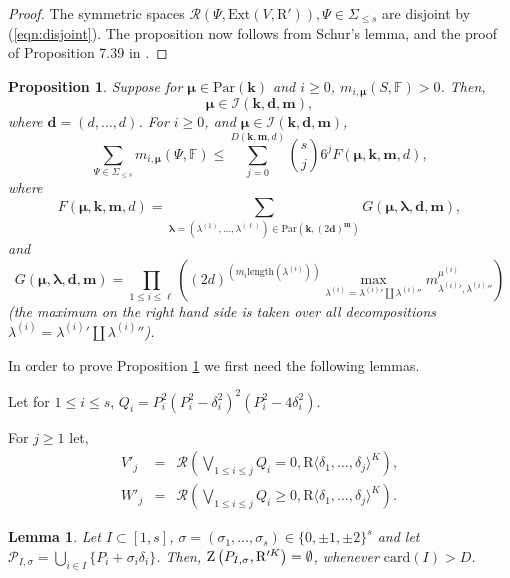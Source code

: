\documentclass{amsart}
\newtheorem{lemma}{Lemma}
\newtheorem{proposition}{Proposition}
\theoremstyle{definition}
\theoremstyle{remark}
\numberwithin{equation}{section}
\begin{document}
\begin{proof}
 The symmetric spaces ${{\mathcal R}} \left(\Psi , {\mathrm{Ext}} \left(V, {\mathrm{R}}' \right) \right) ,
\Psi \in \Sigma_{\leq s}$ are disjoint by (\ref{eqn:disjoint}). The 
proposition now follows from Schur's lemma,
and the proof of Proposition 7.39 in {\cite{BPRbook2}}.
\end{proof}

\begin{proposition}
  \label{7:prop:betti closed}
  Suppose for $\pmb{\mu} \in {\mathrm{Par}}({\mathbf{k}})$ and $i \geq 0$,
  $m_{i, \pmb{\mu}}(S,{\mathbb{F}}) >0$. 
 Then, 
 \begin{equation}
\label{eqn:restriction-on-specht-sa}
\pmb{\mu}  \in 
\mathcal{I}({\mathbf{k}},{\mathbf{d}},{\mathbf{m}}),
\end{equation}
where ${\mathbf{d}} = (d,\ldots,d)$.
For $i \geq 0$, and $\pmb{\mu}  \in 
\mathcal{I}({\mathbf{k}},{\mathbf{d}},{\mathbf{m}})$,
  \[ 
  \sum_{\Psi \in \Sigma_{\le s}} m_{i,\pmb{\mu}}(\Psi,{\mathbb{F}}) \leq 
  \sum_{j=0}^{D({\mathbf{k}},{\mathbf{m}},d)} \binom{s}{j} 6^{j} 
  F(\pmb{\mu}, {\mathbf{k}},{\mathbf{m}},d),
  \]
  where 
  \[
  F(\pmb{\mu},{\mathbf{k}},{\mathbf{m}},d) = 
  \sum_{\pmb{\lambda}=(\lambda^{(1)},\ldots,\lambda^{(\ell)})\in {\mathrm{Par}}({\mathbf{k}}, (2{\mathbf{d}})^{\mathbf{m}})}
G(\pmb{\mu},\pmb{\lambda},{\mathbf{d}},{\mathbf{m}}),
 \]
 and 
\[
G(\pmb{\mu},\pmb{\lambda},{\mathbf{d}},{\mathbf{m}}) =
\prod_{1 \leq i \leq \ell}
 \left(
 (2 d)^{(m_i{\mathrm{length}}(\lambda^{(i)}))}
 \max_{\lambda^{(i)} = {\lambda^{(i)}}' \coprod {\lambda^{(i)}}''}
 m^{\mu^{(i)}}_{{\lambda^{(i)}}',{\lambda^{(i)}}''}
 \right)
 \]
(the maximum on the right hand side is taken over all decompositions
$\lambda^{(i)} = {\lambda^{(i)}}' \coprod {\lambda^{(i)}}''$). 
 \end{proposition}

In order to prove Proposition \ref{7:prop:betti closed} we first need the following lemmas.

Let for $1 \leq i \leq s$, 
$Q_{i} =P_{i}^{2} (P_{i}^{2} - \delta_{i}^{2})^{2} (P_{i}^{2} -4
\delta_{i}^{2})$.

For $j \ge 1$ let,
\begin{eqnarray*}
  V'_{j} & = & {{\mathcal R}}(\bigvee_{1 \leq i \leq j} Q_{i} =0, {\mathrm{R}} {{\langle}}\delta_{1} , \ldots , \delta_{j} {{\rangle}}^{K}) ,\\
  W'_{j} & = & {{\mathcal R}}(\bigvee_{1 \leq i \leq j} Q_{i} \geq 0, {\mathrm{R}} {{\langle}} \delta_{1} , \ldots , \delta_{j} {{\rangle}}^{K}) .
\end{eqnarray*}
\begin{lemma}
  \label{lem:gen-position} Let $I \subset [ 1,s ]$, $\sigma  =  (\sigma_{1} ,
  \ldots , \sigma_{s}) \in \{ 0, \pm 1, \pm 2 \}^{s}$ and let
  $\mathcal{P}_{I, \sigma} =  \bigcup_{i \in I} \{ P_{i} + \sigma_{i}
  \delta_{i} \}$. Then, ${{\rm Z}} \left(P_{I, \sigma} , {\mathrm{R}}'^K \right) = \emptyset$,
  whenever ${\mathrm{card}}(I) >D$.
\end{lemma}
\end{document}
